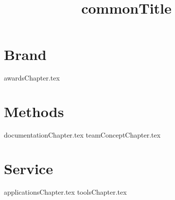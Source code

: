 \documentclass[letterpaper, 12pt]{memoir}  %
\title{ {commonTitle}}  %
\begin{document}
\frontmatter %
\maketitle %
\pagestyle{empty}
\tableofcontents %
\clearpage
\mainmatter %
\setmarginnotes{.1in}{.4in}{.1in}
\setulmarginsandblock{1in}{*}{*}
\checkandfixthelayout
\pagestyle{jalapenoPageStyleA} %
\part{Brand}
{awardsChapter.tex}
\part{Methods}
{documentationChapter.tex}
{teamConceptChapter.tex}
\part{Service}
{applicationsChapter.tex}
{toolsChapter.tex}
\end{document}
